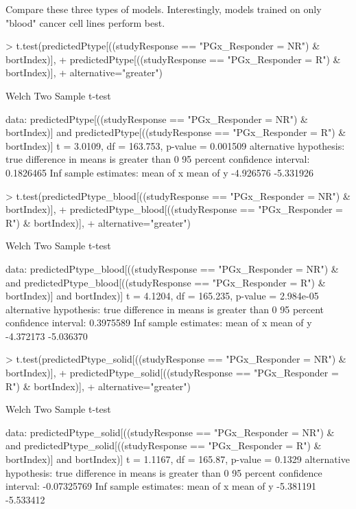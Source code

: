 \documentclass[a4paper]{article}
\begin{document}
Compare these three types of models. Interestingly, models trained on only "blood" cancer cell lines perform best.
\begin{Schunk}
\begin{Sinput}
> t.test(predictedPtype[((studyResponse == "PGx_Responder = NR") & bortIndex)], 
+ predictedPtype[((studyResponse == "PGx_Responder = R") & bortIndex)], 
+ alternative="greater")
\end{Sinput}
\begin{Soutput}
	Welch Two Sample t-test

data:  predictedPtype[((studyResponse == "PGx_Responder = NR") & bortIndex)] and predictedPtype[((studyResponse == "PGx_Responder = R") & bortIndex)]
t = 3.0109, df = 163.753, p-value = 0.001509
alternative hypothesis: true difference in means is greater than 0
95 percent confidence interval:
 0.1826465       Inf
sample estimates:
mean of x mean of y 
-4.926576 -5.331926 
\end{Soutput}
\begin{Sinput}
> t.test(predictedPtype_blood[((studyResponse == "PGx_Responder = NR") & bortIndex)], 
+ predictedPtype_blood[((studyResponse == "PGx_Responder = R") & bortIndex)],
+ alternative="greater")
\end{Sinput}
\begin{Soutput}
	Welch Two Sample t-test

data:  predictedPtype_blood[((studyResponse == "PGx_Responder = NR") &  and predictedPtype_blood[((studyResponse == "PGx_Responder = R") &     bortIndex)] and     bortIndex)]
t = 4.1204, df = 165.235, p-value = 2.984e-05
alternative hypothesis: true difference in means is greater than 0
95 percent confidence interval:
 0.3975589       Inf
sample estimates:
mean of x mean of y 
-4.372173 -5.036370 
\end{Soutput}
\begin{Sinput}
> t.test(predictedPtype_solid[((studyResponse == "PGx_Responder = NR") & bortIndex)], 
+ predictedPtype_solid[((studyResponse == "PGx_Responder = R") & bortIndex)],
+ alternative="greater")
\end{Sinput}
\begin{Soutput}
	Welch Two Sample t-test

data:  predictedPtype_solid[((studyResponse == "PGx_Responder = NR") &  and predictedPtype_solid[((studyResponse == "PGx_Responder = R") &     bortIndex)] and     bortIndex)]
t = 1.1167, df = 165.87, p-value = 0.1329
alternative hypothesis: true difference in means is greater than 0
95 percent confidence interval:
 -0.07325769         Inf
sample estimates:
mean of x mean of y 
-5.381191 -5.533412 
\end{Soutput}
\end{Schunk}
\end{document}
